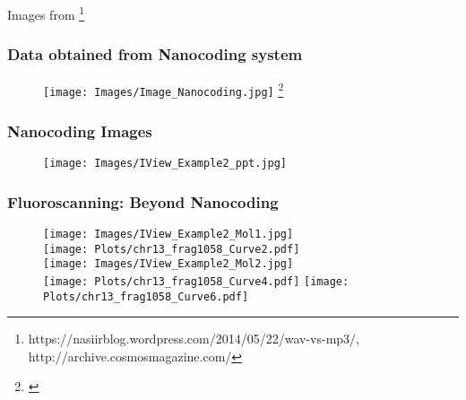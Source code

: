 \documentclass[10pt,dvipsnames,table]{beamer}
\begin{document}
\begin{frame}
\begin{columns}[t]
\begin{column}{0.5\textwidth}
\end{column}
\end{columns}
{\tiny{Images from \footnote{\tiny{https://nasiirblog.wordpress.com/2014/05/22/wav-vs-mp3/, http://archive.cosmosmagazine.com/}} }}
\end{frame}

\begin{frame}
\frametitle{Data obtained from Nanocoding system}
\begin{figure}[T]
\texttt{[image: Images/Image\_Nanocoding.jpg]} \footnote{\tiny{\cite{Kounovsky_2013_PhDThesis}}}
\end{figure}

\note{}
\end{frame}

\begin{frame}
\frametitle{Nanocoding Images}
\begin{center}
\begin{figure}[H]
\texttt{[image: Images/IView\_Example2\_ppt.jpg]}
\end{figure}
\end{center}
\end{frame}

\begin{frame}
\frametitle{Fluoroscanning: Beyond Nanocoding}
\begin{figure}[H]
\texttt{[image: Images/IView\_Example2\_Mol1.jpg]} \\
\texttt{[image: Plots/chr13\_frag1058\_Curve2.pdf]} \\

\texttt{[image: Images/IView\_Example2\_Mol2.jpg]} \\
\texttt{[image: Plots/chr13\_frag1058\_Curve4.pdf]} 
\texttt{[image: Plots/chr13\_frag1058\_Curve6.pdf]} 
\end{figure}

\end{frame}
\end{document}
